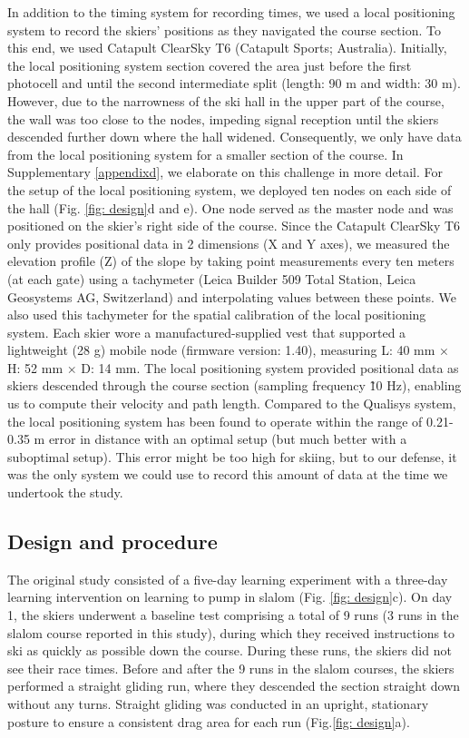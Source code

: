 \documentclass{article}
\begin{document}
In addition to the timing system for recording times, we used a local positioning system to record the skiers' positions as they navigated the course section. To this end, we used Catapult ClearSky T6 (Catapult Sports; Australia). Initially, the local positioning system section covered the area just before the first photocell and until the second intermediate split (length: 90 m and width: 30 m). However, due to the narrowness of the ski hall in the upper part of the course, the wall was too close to the nodes, impeding signal reception until the skiers descended further down where the hall widened. Consequently, we only have data from the local positioning system for a smaller section of the course. In Supplementary \ref{appendixd}, we elaborate on this challenge in more detail. For the setup of the local positioning system, we deployed ten nodes on each side of the hall (Fig. \ref{fig: design}d and e). One node served as the master node and was positioned on the skier's right side of the course. Since the Catapult ClearSky T6 only provides positional data in 2 dimensions (X and Y axes), we measured the elevation profile (Z) of the slope by taking point measurements every ten meters (at each gate) using a tachymeter (Leica Builder 509 Total Station, Leica Geosystems AG, Switzerland) and interpolating values between these points. We also used this tachymeter for the spatial calibration of the local positioning system. Each skier wore a manufactured-supplied vest that supported a lightweight (28 g) mobile node (firmware version: 1.40), measuring L: 40 mm × H: 52 mm × D: 14 mm.  The local positioning system provided positional data as skiers descended through the course section (sampling frequency \~10 Hz), enabling us to compute their velocity and path length. Compared to the Qualisys system, the local positioning system has been found to operate within the range of 0.21-0.35 m error in distance with an optimal setup (but much better with a suboptimal setup)\cite{luteberget_validity_2018}. This error might be too high for skiing, but to our defense, it was the only system we could use to record this amount of data at the time we undertook the study.

\subsection{Design and procedure}
The original study consisted of a five-day learning experiment with a three-day learning intervention on learning to pump in slalom (Fig. \ref{fig: design}c). On day 1, the skiers underwent a baseline test comprising a total of 9 runs (3 runs in the slalom course reported in this study), during which they received instructions to ski as quickly as possible down the course. During these runs, the skiers did not see their race times. Before and after the 9 runs in the slalom courses, the skiers performed a straight gliding run, where they descended the section straight down without any turns. Straight gliding was conducted in an upright, stationary posture to ensure a consistent drag area for each run (Fig.\ref{fig: design}a).
\end{document}
